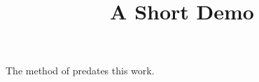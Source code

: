 \documentclass[article]{jss}
\title{A Short Demo}
\begin{document}
The method of \citet{Knuth1984} predates this work.
\end{document}
